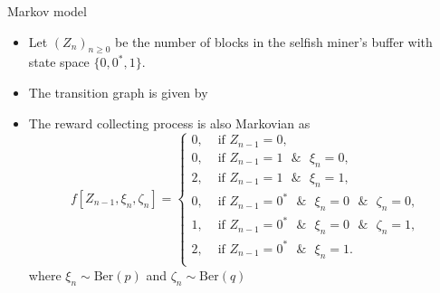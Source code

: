 \documentclass{beamer}
\begin{document}
\begin{frame}{Markov model}
\scriptsize
\begin{itemize}
\item Let $(Z_n)_{n\geq0}$ be the number of blocks in the selfish miner's buffer with state space $\{0, 0^\ast, 1\}$. 

\item The transition graph is given by
\begin{center}
\end{center}
\item The reward collecting process is also Markovian as
\begin{equation*}
f\left[Z_{n-1}, \xi_n,\zeta_{n}\right] = \begin{cases}
0,&\text{ if } Z_{n-1} =0,\\
0,&\text{ if } Z_{n-1} =1\text{ }\&\text{ }\xi_{n} =0,\\
2,&\text{ if } Z_{n-1} =1\text{ }\&\text{ }\xi_{n} =1,\\
0,&\text{ if } Z_{n-1} =0^\ast \text{ }\&\text{ }\xi_{n} = 0\text{ }\&\text{ }\zeta_{n} = 0,\\
1,&\text{ if } Z_{n-1} =0^\ast \text{ }\&\text{ }\xi_{n} = 0\text{ }\&\text{ }\zeta_{n} = 1,\\
2,&\text{ if }Z_{n-1} = 0^\ast \text{ }\&\text{ }\xi_{n} = 1.\\
\end{cases}
\end{equation*}
where $\xi_n\sim\text{Ber}(p)$ and $\zeta_n\sim\text{Ber}(q)$
\end{itemize}
\end{frame}
\end{document}
